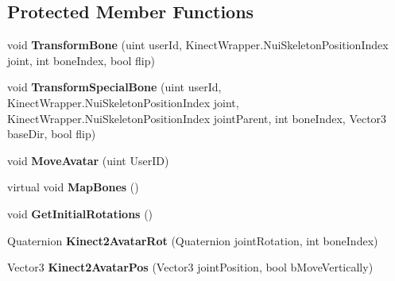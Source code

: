 \subsection*{Protected Member Functions}
\begin{DoxyCompactItemize}
\item 
\mbox{\label{class_avatar_controller_affff56fcbd62ebea1efea35ea4a72cb8}} 
void {\bfseries Transform\+Bone} (uint user\+Id, Kinect\+Wrapper.\+Nui\+Skeleton\+Position\+Index joint, int bone\+Index, bool flip)
\item 
\mbox{\label{class_avatar_controller_a130066065bf8fc071c24a0d0f0972b95}} 
void {\bfseries Transform\+Special\+Bone} (uint user\+Id, Kinect\+Wrapper.\+Nui\+Skeleton\+Position\+Index joint, Kinect\+Wrapper.\+Nui\+Skeleton\+Position\+Index joint\+Parent, int bone\+Index, Vector3 base\+Dir, bool flip)
\item 
\mbox{\label{class_avatar_controller_a639ea57d58fd646c134b6a39525f39c6}} 
void {\bfseries Move\+Avatar} (uint User\+ID)
\item 
\mbox{\label{class_avatar_controller_a8f8cd1cae328cc38cf52f0e6a74e6c10}} 
virtual void {\bfseries Map\+Bones} ()
\item 
\mbox{\label{class_avatar_controller_a6fdb6363fd5dc2dea534889d03df26a7}} 
void {\bfseries Get\+Initial\+Rotations} ()
\item 
\mbox{\label{class_avatar_controller_a0946ebc70d224589da85b0e629675fb6}} 
Quaternion {\bfseries Kinect2\+Avatar\+Rot} (Quaternion joint\+Rotation, int bone\+Index)
\item 
\mbox{\label{class_avatar_controller_a8e275933bb7c53eb46449bd2aa9680f3}} 
Vector3 {\bfseries Kinect2\+Avatar\+Pos} (Vector3 joint\+Position, bool b\+Move\+Vertically)
\end{DoxyCompactItemize}
